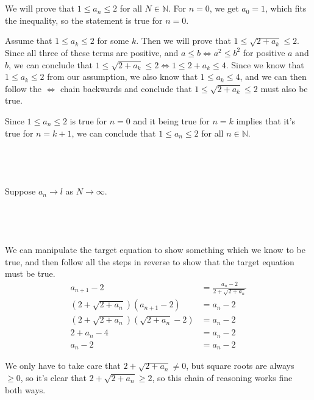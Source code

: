 \documentclass[a4paper]{article}
\begin{document}
\subsection{~}

We will prove that $1 \le a_n \le 2$ for all $N \in \mathbb N$. For $n=0$, we get $a_0 = 1$, which fits the inequality, so the statement is true for $n=0$.

Assume that $1 \le a_k \le 2$ for some $k$. Then we will prove that $1 \le \sqrt{2 + a_k} \le 2$. Since all three of these terms are positive, and $a \le b \iff a^2 \le b^2$ for positive $a$ and $b$, we can conclude that $1 \le \sqrt{2 + a_k} \le 2 \iff 1 \le 2 + a_k \le 4$. Since we know that $1 \le a_k \le 2$ from our assumption, we also know that $1 \le a_k \le 4$, and we can then follow the $\iff$ chain backwards and conclude that $1 \le \sqrt{2 + a_k} \le 2$ must also be true.

Since $1 \le a_n \le 2$ is true for $n=0$ and it being true for $n=k$ implies that it's true for $n=k+1$, we can conclude that $1 \le a_n \le 2$ for all $n \in \mathbb N$.

\subsection{~}

Suppose $a_n \to l$ as $N \to \infty$.

\subsection{~}

We can manipulate the target equation to show something which we know to be true, and then follow all the steps in reverse to show that the target equation must be true.
\begin{align*}
	a_{n+1} - 2 &= \frac{a_n - 2}{2 + \sqrt{2 + a_n}}\\
	\left( 2 + \sqrt{2 + a_n} \right) (a_{n+1} - 2) &= a_n - 2\\
	\left( 2 + \sqrt{2 + a_n} \right) \left( \sqrt{2 + a_n} - 2 \right) &= a_n - 2\\
	2 + a_n - 4 &= a_n - 2\\
	a_n - 2 &= a_n - 2
\end{align*}

We only have to take care that $2 + \sqrt{2 + a_n} \ne 0$, but square roots are always $\ge 0$, so it's clear that $2 + \sqrt{2 + a_n} \ge 2$, so this chain of reasoning works fine both ways.
\end{document}
